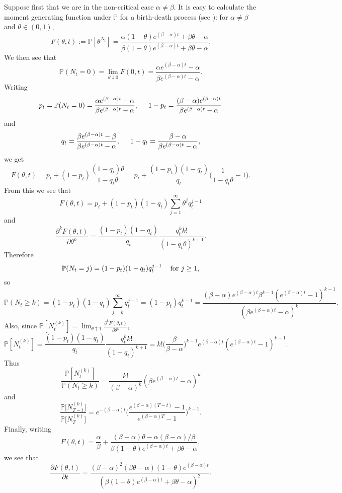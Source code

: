 \documentclass{article}
\theoremstyle{plain}
\theoremstyle{definition}
\renewcommand{\P}{\mathbb{P}}
\begin{document}
Suppose first that we are in the non-critical case $\alpha\neq\beta$. It is easy to calculate the moment generating function under $\P$ for a birth-death process (see \cite[Chapter III, Section 5]{athreya_ney:branching_processes}): for $\alpha\neq\beta$ and $\theta\in(0,1)$,
\[F(\theta,t) := \P[\theta^{N_t}] = \frac{\alpha(1-\theta)e^{(\beta-\alpha)t} + \beta \theta-\alpha}{\beta(1-\theta)e^{(\beta-\alpha)t} + \beta \theta-\alpha}.\]
We then see that
\[\P(N_t = 0) = \lim_{\theta\downarrow 0} F(0,t) = \frac{\alpha e^{(\beta-\alpha)t}-\alpha}{\beta e^{(\beta-\alpha)t}-\alpha}.\]
Writing
\[p_t = \P(N_t=0) = \frac{\alpha e^{(\beta-\alpha)t}-\alpha}{\beta e^{(\beta-\alpha)t}-\alpha}, \hspace{5mm} 1-p_t = \frac{(\beta-\alpha)e^{(\beta-\alpha)t}}{\beta e^{(\beta-\alpha)t}-\alpha}\]
and
\[q_t = \frac{\beta e^{(\beta-\alpha)t}-\beta}{\beta e^{(\beta-\alpha)t}-\alpha}, \hspace{5mm} 1-q_t = \frac{\beta-\alpha}{\beta e^{(\beta-\alpha)t}-\alpha},\]
we get
\[F(\theta,t) = p_t + (1-p_t)\frac{(1-q_t)\theta}{1-q_t\theta} = p_t + \frac{(1-p_t)(1-q_t)}{q_t}\Big(\frac{1}{1-q_t\theta}-1\Big).\]
From this we see that
\[F(\theta,t) = p_t + (1-p_t)(1-q_t)\sum_{j=1}^\infty \theta^j q_t^{j-1}\]
and
\[\frac{\partial^k F(\theta,t)}{\partial \theta^k} = \frac{(1-p_t)(1-q_t)}{q_t}\frac{q_t^k k!}{(1-q_t\theta)^{k+1}}.\]
Therefore
\[\P(N_t = j) = (1-p_t)(1-q_t)q_t^{j-1} \hspace{3mm} \hbox{ for } j\ge 1,\]
so
\[\P(N_t \ge k) = (1-p_t)(1-q_t)\sum_{j=k}^\infty q_t^{j-1} = (1-p_t)q_t^{k-1} = \frac{(\beta-\alpha)e^{(\beta-\alpha)t}\beta^{k-1}(e^{(\beta-\alpha)t}-1)^{k-1}}{(\beta e^{(\beta-\alpha)t} - \alpha)^k}.\]
Also, since $\P[N_t^{(k)}] = \lim_{\theta\uparrow 1}\frac{\partial^k F(\theta,t)}{\partial \theta^k}$,
\begin{equation}\label{Pmom}
\P[N_t^{(k)}] = \frac{(1-p_t)(1-q_t)}{q_t} \frac{q_t^k k!}{(1-q_t)^{k+1}} = k! \Big(\frac{\beta}{\beta-\alpha}\Big)^{k-1} e^{(\beta-\alpha)t}(e^{(\beta-\alpha)t}-1)^{k-1}.
\end{equation}
Thus
\begin{equation}\label{Pcond}
\frac{\P[N_t^{(k)}]}{\P(N_t\ge k)} = \frac{k!}{(\beta-\alpha)^k} (\beta e^{(\beta-\alpha)t}-\alpha)^k
\end{equation}
and
\begin{equation}\label{Pratio}
\frac{\P\big[N_{T-t}^{(k)}\big]}{\P\big[N_T^{(k)}\big]} = e^{-(\beta-\alpha)t}\Big(\frac{e^{(\beta-\alpha)(T-t)}-1}{e^{(\beta-\alpha)T}-1}\Big)^{k-1}.
\end{equation}
Finally, writing
\[F(\theta,t) = \frac{\alpha}{\beta} + \frac{(\beta-\alpha)\theta - \alpha(\beta-\alpha)/\beta}{\beta(1-\theta)e^{(\beta-\alpha)t} + \beta \theta-\alpha},\]
we see that
\begin{equation}\label{Fpartial}
\frac{\partial F(\theta,t)}{\partial t} = \frac{(\beta-\alpha)^2 (\beta \theta - \alpha)(1-\theta)e^{(\beta-\alpha)t}}{(\beta(1-\theta)e^{(\beta-\alpha)t} + \beta \theta - \alpha)^2}.
\end{equation}
\end{document}
